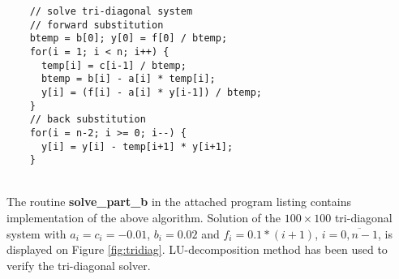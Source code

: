 \documentclass[]{article}
\begin{document}
  \begin{lstlisting}
    // solve tri-diagonal system
    // forward substitution
    btemp = b[0]; y[0] = f[0] / btemp;
    for(i = 1; i < n; i++) {
      temp[i] = c[i-1] / btemp;
      btemp = b[i] - a[i] * temp[i];
      y[i] = (f[i] - a[i] * y[i-1]) / btemp;
    }
    // back substitution
    for(i = n-2; i >= 0; i--) {
      y[i] = y[i] - temp[i+1] * y[i+1];
    }
  \end{lstlisting}
  \ \\
  The routine {\bf solve\_part\_b} in the attached program listing contains implementation of the above algorithm.
  Solution of the $100\times 100$ tri-diagonal system with $a_i = c_i = - 0.01$, $b_i = 0.02$ and $f_i = 0.1*(i+1)$,
  $i=\overline{0,n-1}$, is displayed on Figure \ref{fig:tridiag}. LU-decomposition method has been used to verify
  the tri-diagonal solver.\\
\end{document}
